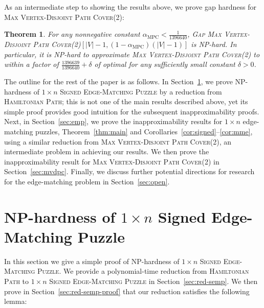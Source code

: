 \documentclass[11pt]{article}
\newtheorem{theorem}{Theorem}
\def\MPC{\mathrm{MPC}}
\def\Gap#1{\textsc{Gap} #1}
\begin{document}
As an intermediate step to showing the results above, we prove gap hardness for \textsc{Max Vertex-Disjoint Path Cover(2)}:

\begin{theorem} \label{thm:gapmvdpc}
For any nonnegative constant $\alpha_{\MPC} < \frac{1}{1396640}$, \Gap{\textsc{Max Vertex-Disjoint Path Cover(2)}}$[|V|-1, (1-\alpha_{\MPC})(|V|-1)]$ is NP-hard. In particular, it is NP-hard to approximate \textsc{Max Vertex-Disjoint Path Cover(2)} to within a factor of $\frac{1396639}{1396640}  + \delta$ of optimal for any sufficiently small constant $\delta > 0$.
\end{theorem}


The outline for the rest of the paper is as follows. In Section~\ref{sec:exactemp}, we prove NP-hardness of \textsc{$1\times n$ Signed Edge-Matching Puzzle} by a reduction from \textsc{Hamiltonian Path}; this is not one of the main results described above, yet its simple proof provides good intuition for the subsequent inapproximability proofs. Next, in Section~\ref{sec:emp}, we prove the inapproximability results for $1 \times n$ edge-matching puzzles, Theorem~\ref{thm:main} and Corollaries~\ref{cor:signed}--\ref{cor:mme}, using a similar reduction from \textsc{Max Vertex-Disjoint Path Cover(2)}, an intermediate problem in achieving our results. We then prove the inapproximability result for \textsc{Max Vertex-Disjoint Path Cover(2)} in Section~\ref{sec:mvdpc}. Finally, we discuss further potential directions for research for the edge-matching problem in Section~\ref{sec:open}.

\section{NP-hardness of $1 \times n$ Signed Edge-Matching Puzzle} \label{sec:exactemp}

In this section we give a simple proof of NP-hardness of \textsc{$1 \times n$ Signed Edge-Matching Puzzle}. We provide a polynomial-time reduction from \textsc{Hamiltonian Path} to \textsc{$1 \times n$ Signed Edge-Matching Puzzle} in Section~\ref{sec:red-semp}. We then prove in Section~\ref{sec:red-semp-proof} that our reduction satisfies the following lemma:
\end{document}

